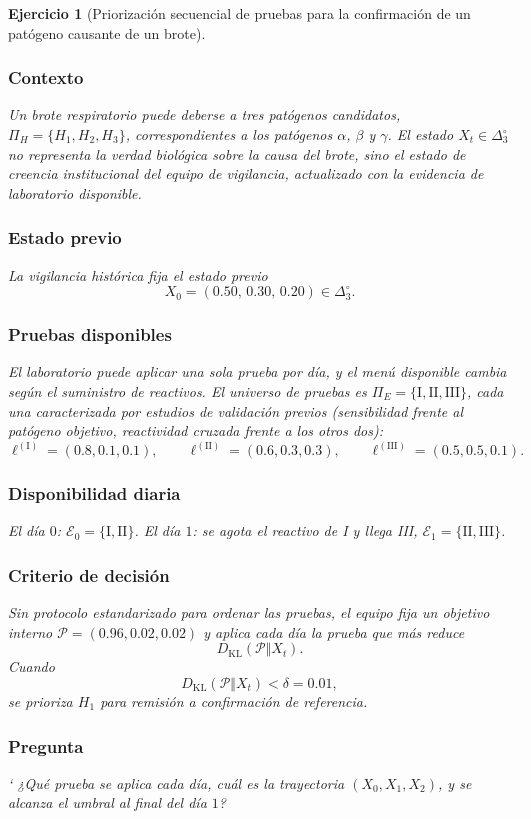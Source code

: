 ﻿\documentclass[12pt]{article}
\newtheorem{ejercicio}{Ejercicio}[section]
\begin{document}
\begin{ejercicio}[Priorización secuencial de pruebas para la confirmación de un patógeno causante de un brote]\label{ej:validacion_patogeno}
\subsubsection*{Contexto}
Un brote respiratorio puede deberse a tres patógenos candidatos, $\Pi_H=\{H_1,H_2,H_3\}$, correspondientes a los patógenos $\alpha$, $\beta$ y $\gamma$. El estado $X_t\in\Delta_3^\circ$ no representa la verdad biológica sobre la causa del brote, sino el estado de creencia institucional del equipo de vigilancia, actualizado con la evidencia de laboratorio disponible.

\subsubsection*{Estado previo}
La vigilancia histórica fija el estado previo
\[
X_0=(0.50,\,0.30,\,0.20)\in\Delta_3^\circ.
\]

\subsubsection*{Pruebas disponibles}
El laboratorio puede aplicar una sola prueba por día, y el menú disponible cambia según el suministro de reactivos. El universo de pruebas es $\Pi_E=\{\mathrm{I,II,III}\}$, cada una caracterizada por estudios de validación previos (sensibilidad frente al patógeno objetivo, reactividad cruzada frente a los otros dos):
\[
\ell^{(\mathrm I)}=(0.8,0.1,0.1),\qquad
\ell^{(\mathrm{II})}=(0.6,0.3,0.3),\qquad
\ell^{(\mathrm{III})}=(0.5,0.5,0.1).
\]

\subsubsection*{Disponibilidad diaria}
El día $0$: $\mathcal E_0=\{\mathrm I,\mathrm{II}\}$. El día $1$: se agota el reactivo de I y llega III, $\mathcal E_1=\{\mathrm{II},\mathrm{III}\}$.

\subsubsection*{Criterio de decisión}
Sin protocolo estandarizado para ordenar las pruebas, el equipo fija un objetivo interno $\mathcal P=(0.96,0.02,0.02)$ y aplica cada día la prueba que más reduce
\[
D_{\mathrm{KL}}(\mathcal P\Vert X_t).
\]
Cuando
\[
D_{\mathrm{KL}}(\mathcal P\Vert X_t)<\delta=0.01,
\]
se prioriza $H_1$ para remisión a confirmación de referencia.

\subsubsection*{Pregunta}
‘ ¿Qué prueba se aplica cada día, cuál es la trayectoria $(X_0,X_1,X_2)$, y se alcanza el umbral al final del día $1$?
\end{ejercicio}
\end{document}
